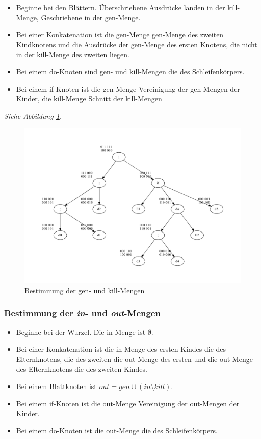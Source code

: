\begin{itemize}
    \item Beginne bei den Blättern. Überschriebene Ausdrücke landen in der kill-Menge,
        Geschriebene in der gen-Menge.
    \item Bei einer Konkatenation ist die gen-Menge gen-Menge des zweiten Kindknotens
        und die Ausdrücke der gen-Menge des ersten Knotens, die nicht in der kill-Menge
        des zweiten liegen.
    \item Bei einem do-Knoten sind gen- und kill-Mengen die des Schleifenkörpers.
    \item Bei einem if-Knoten ist die gen-Menge Vereinigung der gen-Mengen der Kinder,
        die kill-Menge Schnitt der kill-Mengen
\end{itemize}
\textit{Siehe Abbildung \ref{convent:genkill}.}
\begin{figure}
    \centering
    \includegraphics[scale=0.45]{images/convent-genkill.pdf}
    \caption{Bestimmung der gen- und kill-Mengen}
    \label{convent:genkill}
\end{figure}

\subsubsection{Bestimmung der \textit{in}- und \textit{out}-Mengen}

\begin{itemize}
    \item Beginne bei der Wurzel. Die in-Menge ist $\emptyset$.
    \item Bei einer Konkatenation ist die in-Menge des ersten Kindes die des Elternknotens,
        die des zweiten die out-Menge des ersten und die out-Menge des Elternknotens die des
        zweiten Kindes.
    \item Bei einem Blattknoten ist $out = gen \cup (in \setminus kill)$.
    \item Bei einem if-Knoten ist die out-Menge Vereinigung der out-Mengen der Kinder.
    \item Bei einem do-Knoten ist die out-Menge die des Schleifenkörpers.
\end{itemize}

